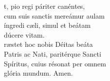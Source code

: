\vspace{0.3cm}


\vspace{0.15cm}

\def\greinitialformat#1{{\fontsize{40}{40}\selectfont #1}}

\vspace{0.3cm}
\begin{centering}



t, pio regi páriter canéntes,\\ 
cum suis sanctis mereámur aulam\\
íngredi cæli, simul et beátam\\
	dúcere vitam.\\
	
ræstet hoc nobis Déitas beáta\\
Patris ac Nati, paritérque Sancti\\
Spíritus, cuius résonat per omnem\\
	glória mundum. Amen.\\


\end{centering}

\newpage